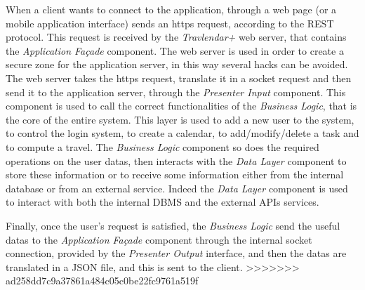 When a client wants to connect to the application, through a web page (or a mobile application interface) sends an https request, according to the REST protocol. This request is received by the \emph{Travlendar+} web server, that contains the \emph{Application Façade} component. The web server is used in order to create a secure zone for the application server, in this way several hacks can be avoided. The web server takes the https request, translate it in a socket request and then send it to the application server, through the \emph{Presenter Input} component. This component is used to call the correct functionalities of the \emph{Business Logic}, that is the core of the entire system. This layer is used to add a new user to the system, to control the login system, to create a calendar, to add/modify/delete a task and to compute a travel. The \emph{Business Logic} component so does the required operations on the user datas, then interacts with the \emph{Data Layer} component to store these information or to receive some information either from the internal database or from an external service. Indeed the \emph{Data Layer} component is used to interact with both the internal DBMS and the external APIs services.

Finally, once the user's request is satisfied, the \emph{Business Logic} send the useful datas to the \emph{Application Façade} component through the internal socket connection, provided by the \emph{Presenter Output} interface, and then the datas are translated in a JSON file, and this is sent to the client.
>>>>>>> ad258dd7c9a37861a484c05c0be22fc9761a519f
